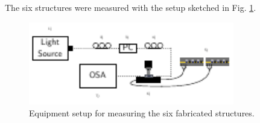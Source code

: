 
The six structures were measured with the setup sketched in Fig. \ref{fig:Setup}.

\begin{figure}[H]
    \centering
    \includegraphics[width=0.8\textwidth]{fig/Setup.pdf}
    \caption{Equipment setup for measuring the six fabricated structures.}
    \label{fig:Setup}
\end{figure}

